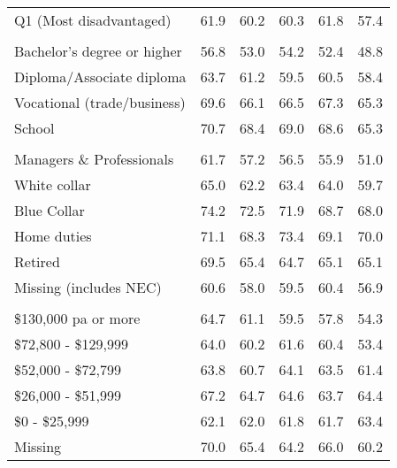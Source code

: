 \documentclass[
]{book}
\begin{document}
\begin{table}
\begin{tabular}{lrrrrr}
\hspace{1em}Q1 (Most disadvantaged) & 61.9 & 60.2 & 60.3 & 61.8 & 57.4\\
\addlinespace[0.3em]
\multicolumn{6}{l}{\textbf{Heighest attained education}}\\
\hspace{1em}Bachelor’s degree or higher & 56.8 & 53.0 & 54.2 & 52.4 & 48.8\\
\hspace{1em}Diploma/Associate diploma & 63.7 & 61.2 & 59.5 & 60.5 & 58.4\\
\hspace{1em}Vocational (trade/business) & 69.6 & 66.1 & 66.5 & 67.3 & 65.3\\
\hspace{1em}School & 70.7 & 68.4 & 69.0 & 68.6 & 65.3\\
\addlinespace[0.3em]
\multicolumn{6}{l}{\textbf{Occupation}}\\
\hspace{1em}Managers \& Professionals & 61.7 & 57.2 & 56.5 & 55.9 & 51.0\\
\hspace{1em}White collar & 65.0 & 62.2 & 63.4 & 64.0 & 59.7\\
\hspace{1em}Blue Collar & 74.2 & 72.5 & 71.9 & 68.7 & 68.0\\
\hspace{1em}Home duties & 71.1 & 68.3 & 73.4 & 69.1 & 70.0\\
\hspace{1em}Retired & 69.5 & 65.4 & 64.7 & 65.1 & 65.1\\
\hspace{1em}Missing (includes NEC) & 60.6 & 58.0 & 59.5 & 60.4 & 56.9\\
\addlinespace[0.3em]
\multicolumn{6}{l}{\textbf{Household income}}\\
\hspace{1em}\$130,000 pa or more & 64.7 & 61.1 & 59.5 & 57.8 & 54.3\\
\hspace{1em}\$72,800 - \$129,999 & 64.0 & 60.2 & 61.6 & 60.4 & 53.4\\
\hspace{1em}\$52,000 - \$72,799 & 63.8 & 60.7 & 64.1 & 63.5 & 61.4\\
\hspace{1em}\$26,000 - \$51,999 & 67.2 & 64.7 & 64.6 & 63.7 & 64.4\\
\hspace{1em}\$0 - \$25,999 & 62.1 & 62.0 & 61.8 & 61.7 & 63.4\\
\hspace{1em}Missing & 70.0 & 65.4 & 64.2 & 66.0 & 60.2\\
\bottomrule
\end{tabular}
\endgroup{}
\end{table}
\end{document}
